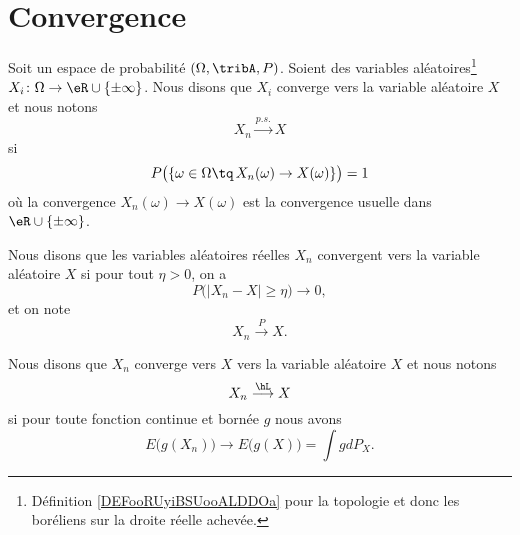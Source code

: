 \section{Convergence}

\begin{definition}      \label{DEFooZKLFooZkKuMC}
	Soit un espace de probabilité \( (\Omega,\tribA,P)\). Soient des variables aléatoires\footnote{Définition \ref{DEFooRUyiBSUooALDDOa} pour la topologie et donc les boréliens sur la droite réelle achevée.} \( X_i\colon \Omega\to \eR\cup\{ \pm\infty \}\).
	Nous disons que \( X_i\) converge  vers la variable aléatoire \( X\) et nous notons
	\begin{equation}
		X_n\stackrel{p.s.}{\longrightarrow}X
	\end{equation}
	si
	\begin{equation}
		P\big( \{ \omega\in\Omega\tq\,X_n(\omega)\to X(\omega) \} \big)=1
	\end{equation}
	où la convergence \( X_n(\omega)\to X(\omega)\) est la convergence usuelle dans \( \eR\cup\{ \pm\infty \}\).
\end{definition}

\begin{definition}
	Nous disons que les variables aléatoires réelles \( X_n\) convergent  vers la variable aléatoire \( X\) si pour tout \( \eta>0\), on a
	\begin{equation}
		P\big( | X_n-X |\geq \eta \big)\to 0,
	\end{equation}
	et on note
	\begin{equation}
		X_n\stackrel{P}{\longrightarrow}X.
	\end{equation}
\end{definition}

\begin{definition}
	Nous disons que \( X_n\) converge vers \( X\)  vers la variable aléatoire \( X\) et nous notons
	\begin{equation}
		X_n\stackrel{\hL}{\longrightarrow}X
	\end{equation}
	si pour toute fonction continue et bornée \( g\) nous avons
	\begin{equation}
		E\big( g(X_n) \big)\to E\big( g(X) \big)=\int gdP_X.
	\end{equation}
\end{definition}


